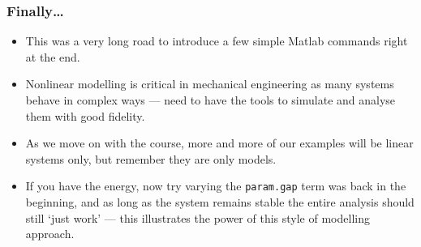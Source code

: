 \documentclass[9pt]{beamer-control}
\begin{document}
\begin{frame}
  \frametitle{Finally\dots}

  \begin{itemize}
    \item This was a very long road to introduce a few simple Matlab commands right at the end.
    \item Nonlinear modelling is critical in mechanical engineering as many systems behave in complex ways --- need to have the tools to simulate and analyse them with good fidelity.
    \item As we move on with the course, more and more of our examples will be linear systems only, but remember they are only models.
    \item \alert{If you have the energy, now try varying the \texttt{param.gap} term was back in the beginning, and as long as the system remains stable the entire analysis should still `just work' --- this illustrates the power of this style of modelling approach.}
  \end{itemize}

\end{frame}
\end{document}
